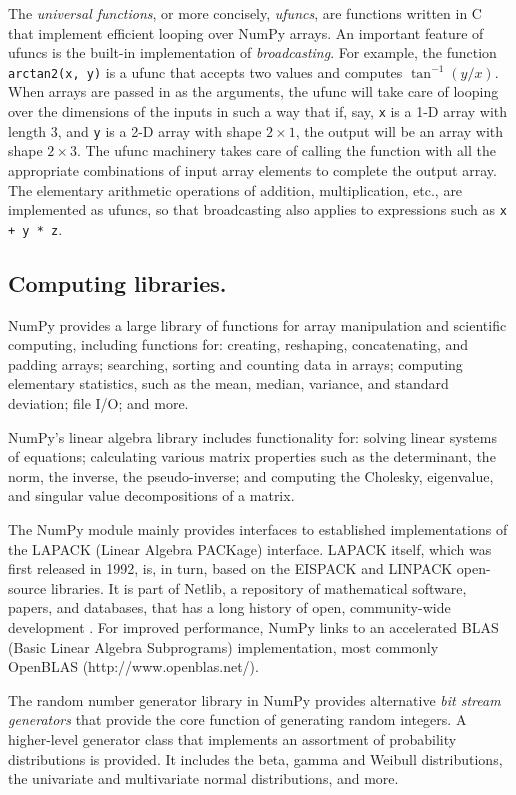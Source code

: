 \documentclass{article}
\begin{document}
The \emph{universal functions}, or more concisely, \emph{ufuncs},
are functions written in C that implement efficient looping over
NumPy arrays. An important feature of ufuncs is the built-in
implementation of \emph{broadcasting}.  For example, the function
\texttt{arctan2(x, y)} is a ufunc that accepts two values and computes
$\tan^{-1}(y/x)$.  When arrays are passed in as the arguments,
the ufunc will take care of looping over the dimensions of the inputs
in such a way that if, say, \texttt{x} is a 1-D array with length 3, and
\texttt{y} is a 2-D array with shape $2 \times 1$, the output will be
an array with shape $2 \times 3$.
The ufunc machinery takes care
of calling the function with all the appropriate combinations of
input array elements to complete the output array.
The elementary arithmetic operations of addition, multiplication, etc.,
are implemented as ufuncs, so that broadcasting also applies to expressions
such as \texttt{x + y * z}.

\subsection*{Computing libraries.}

NumPy provides a large library of functions for array manipulation
and scientific computing, including functions for: creating, reshaping,
concatenating, and padding arrays; searching, sorting and counting data
in arrays; computing elementary statistics, such as the mean, median,
variance, and standard deviation; file I/O; and more.

NumPy's linear algebra library includes functionality for: solving
linear systems of equations; calculating various matrix properties
such as the determinant, the norm, the inverse, the pseudo-inverse;
and computing the Cholesky, eigenvalue, and singular value
decompositions of a matrix.

The NumPy module mainly provides interfaces to established
implementations of the LAPACK (Linear Algebra PACKage) \cite{LAPACK}
interface.  LAPACK itself, which was first released in 1992, is, in
turn, based on the EISPACK and LINPACK open-source libraries. It is
part of Netlib, a repository of mathematical software, papers, and
databases, that has a long history of open, community-wide
development \cite{dongarra1990lapack,dongarra2008netlib}. For improved
performance, NumPy links to an accelerated BLAS (Basic Linear Algebra
Subprograms) implementation, most commonly OpenBLAS
(http://www.openblas.net/).

The random number generator library in NumPy provides alternative
\emph{bit stream generators} that provide the core function of generating
random integers.
A higher-level generator class that implements an assortment of
probability distributions is provided. It includes the beta, gamma
and Weibull distributions, the univariate and multivariate normal
distributions, and more.
\end{document}
